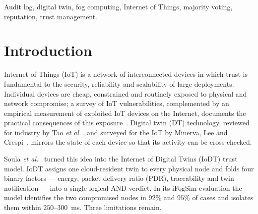 \begin{keywords}
Audit log, digital twin, fog computing, Internet of Things, majority
voting, reputation, trust management.
\end{keywords}

\titlepgskip=-15pt

\maketitle

\section{Introduction}
\label{sec:intro}
 Internet of Things (IoT) is a network of
interconnected devices in which trust is fundamental to the security,
reliability and scalability of large deployments.  Individual devices
are cheap, constrained and routinely exposed to physical and network
compromise; a survey of IoT vulnerabilities, complemented by an
empirical measurement of exploited IoT devices on the Internet,
documents the practical consequences of this exposure~\cite{neshenko2019demystifying}.
Digital twin (DT) technology, reviewed for industry by Tao
\textit{et al.}~\cite{tao2019digital} and surveyed for the IoT by Minerva, Lee and
Crespi~\cite{minerva2020digital}, mirrors the state of each device so
that its activity can be cross-checked.

Soula \textit{et al.}~\cite{soula2024iodt} turned this idea into the
Internet of Digital Twins (IoDT) trust model.  IoDT assigns one
cloud-resident twin to every physical node and folds four binary
factors --- energy, packet delivery ratio (PDR), traceability and twin
notification --- into a single logical-AND verdict.  In its iFogSim
evaluation the model identifies the two compromised nodes in $92\%$
and $95\%$ of cases and isolates them within $250$--$300$~ms.  Three
limitations remain.

